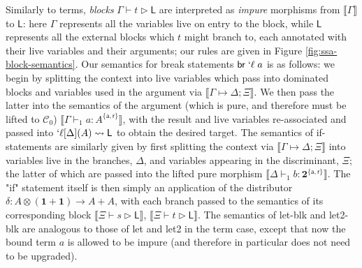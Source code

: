 \documentclass[acmsmall,screen,review]{acmart}
\newcommand{\mc}[1]{\ensuremath{\mathcal{#1}}}
\newcommand{\mb}[1]{\ensuremath{\mathbf{#1}}}
\newcommand{\ms}[1]{\ensuremath{\mathsf{#1}}}
\newcommand{\lbl}[1]{{`#1}}
\newcommand{\brb}[2]{\ms{br}\;#1\;#2}
\newcommand{\lbrb}[2]{\brb{\lbl{#1}}{#2}}
\newcommand{\csplits}[3]{#1 \mapsto #2;#3}
\newcommand{\lwk}[2]{#1 \rightsquigarrow #2}
\newcommand{\lhyp}[3]{#1[#2](#3)}
\newcommand{\llhyp}[3]{\lhyp{\lbl{#1}}{#2}{#3}}
\newcommand{\rle}[1]{{\scriptsize\textsf{#1}}}
\newcommand{\tint}{{\{\ms{a}, \ms{r}\}}}
\newcommand{\hasty}[5]{#1 \vdash_{#2} #3: {#4}^{#5}}
\newcommand{\haslb}[3]{#1 \vdash #2 \rhd #3}
\newcommand{\dnt}[1]{\llbracket{#1}\rrbracket}
\begin{document}
Similarly to terms, \textit{blocks} \(\haslb{\Gamma}{t}{\ms{L}}\) are
interpreted as \textit{impure} morphisms from \(\dnt{\Gamma}\) to \(\ms{L}\):
here \(\Gamma\) represents all the variables live on entry to the block, while
\(\ms{L}\) represents all the external blocks which \(t\) might branch to, each
annotated with their live variables and their arguments; our rules are given in
Figure \ref{fig:ssa-block-semantics}. Our semantics for break statements
\(\lbrb{\ell}{a}\) is as follows: we begin by splitting the context into live
variables which pass into dominated blocks and variables used in the argument
via \(\dnt{\csplits{\Gamma}{\Delta}{\Xi}}\). We then pass the latter into the
semantics of the argument (which is pure, and therefore must be lifted to
\(\mc{C}_0\)) \(\dnt{\hasty{\Gamma}{1}{a}{A}{\tint}}\), with the result and live
variables re-associated and passed into
\(\lwk{\llhyp{\ell}{\Delta}{A}}{\ms{L}}\) to obtain the desired target. The
semantics of if-statements are similarly given by first splitting the context
via \(\dnt{\csplits{\Gamma}{\Delta}{\Xi}}\) into variables live in the branches,
\(\Delta\), and variables appearing in the discriminant, \(\Xi\); the latter of
which are passed into the lifted pure morphism
\(\dnt{\hasty{\Delta}{1}{b}{\mb{2}}{\tint}}\). The "if" statement itself is then
simply an application of the distributor \(\delta: A \otimes (\mb{1} + \mb{1})
\to A + A\), with each branch passed to the semantics of its corresponding block
\(\dnt{\haslb{\Xi}{s}{\ms{L}}}\), \(\dnt{\haslb{\Xi}{t}{\ms{L}}}\). The
semantics of \rle{let-blk} and \rle{let2-blk} are analogous to those of
\rle{let} and \rle{let2} in the term case, except that now the bound term \(a\)
is allowed to be impure (and therefore in particular does not need to be
upgraded).
\end{document}
